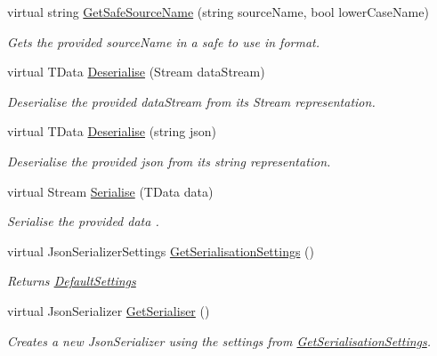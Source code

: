 \begin{DoxyCompactItemize}
virtual string \hyperlink{classCqrs_1_1Azure_1_1BlobStorage_1_1StorageStore_ad3364a0c84d5ed666615b9528d6f640e_ad3364a0c84d5ed666615b9528d6f640e}{Get\+Safe\+Source\+Name} (string source\+Name, bool lower\+Case\+Name)
\begin{DoxyCompactList}\small\item\em Gets the provided {\itshape source\+Name}  in a safe to use in format. \end{DoxyCompactList}\item 
virtual T\+Data \hyperlink{classCqrs_1_1Azure_1_1BlobStorage_1_1StorageStore_a211bc47bff1108d10e319fee8b9769a0_a211bc47bff1108d10e319fee8b9769a0}{Deserialise} (Stream data\+Stream)
\begin{DoxyCompactList}\small\item\em Deserialise the provided {\itshape data\+Stream}  from its Stream representation. \end{DoxyCompactList}\item 
virtual T\+Data \hyperlink{classCqrs_1_1Azure_1_1BlobStorage_1_1StorageStore_adea25452991418693ed966797581f67f_adea25452991418693ed966797581f67f}{Deserialise} (string json)
\begin{DoxyCompactList}\small\item\em Deserialise the provided {\itshape json}  from its string representation. \end{DoxyCompactList}\item 
virtual Stream \hyperlink{classCqrs_1_1Azure_1_1BlobStorage_1_1StorageStore_a8e5d4e50e054d963f96aaa4808794718_a8e5d4e50e054d963f96aaa4808794718}{Serialise} (T\+Data data)
\begin{DoxyCompactList}\small\item\em Serialise the provided {\itshape data} . \end{DoxyCompactList}\item 
virtual Json\+Serializer\+Settings \hyperlink{classCqrs_1_1Azure_1_1BlobStorage_1_1StorageStore_a9ded88f1b48cf61b3be826fb0997adfb_a9ded88f1b48cf61b3be826fb0997adfb}{Get\+Serialisation\+Settings} ()
\begin{DoxyCompactList}\small\item\em Returns \hyperlink{classCqrs_1_1Azure_1_1BlobStorage_1_1StorageStore_ac5c27123fd0bf4d926a4865e2d6b0bdd_ac5c27123fd0bf4d926a4865e2d6b0bdd}{Default\+Settings} \end{DoxyCompactList}\item 
virtual Json\+Serializer \hyperlink{classCqrs_1_1Azure_1_1BlobStorage_1_1StorageStore_acca953271229a19433db9c38c85b5b9e_acca953271229a19433db9c38c85b5b9e}{Get\+Serialiser} ()
\begin{DoxyCompactList}\small\item\em Creates a new Json\+Serializer using the settings from \hyperlink{classCqrs_1_1Azure_1_1BlobStorage_1_1StorageStore_a9ded88f1b48cf61b3be826fb0997adfb_a9ded88f1b48cf61b3be826fb0997adfb}{Get\+Serialisation\+Settings}. \end{DoxyCompactList}\end{DoxyCompactItemize}
